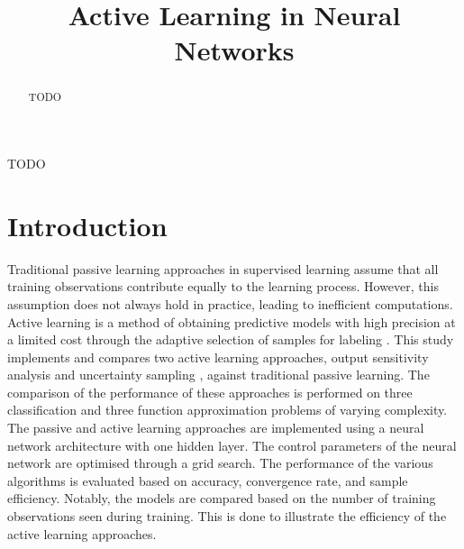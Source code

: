 \documentclass[10pt, conference]{IEEEtran}
\begin{document}
\title{Active Learning in Neural Networks\\

}

\author{
}

\maketitle

\begin{abstract}
TODO
\end{abstract}

\begin{IEEEkeywords}
TODO
\end{IEEEkeywords}

\section{Introduction}
Traditional passive learning approaches in supervised learning assume that all training observations contribute equally to the learning process. However, this assumption does not always hold in practice, leading to inefficient computations. Active learning is a method of obtaining predictive models with high precision at a limited cost through the adaptive selection of samples for labeling \cite{Hino2020ActiveLP}. This study implements and compares two active learning approaches, output sensitivity analysis \cite{sasla} and uncertainty sampling \cite{alus}, against traditional passive learning. The comparison of the performance of these approaches is performed on three classification and three function approximation problems of varying complexity. 
The passive and active learning approaches are implemented using a neural network architecture with one hidden layer. The control parameters of the neural network are optimised through a grid search. The performance of the various algorithms is evaluated based on accuracy, convergence rate, and sample efficiency. Notably, the models are compared based on the number of training observations seen during training. This is done to illustrate the efficiency of the active learning approaches.

\end{document}
